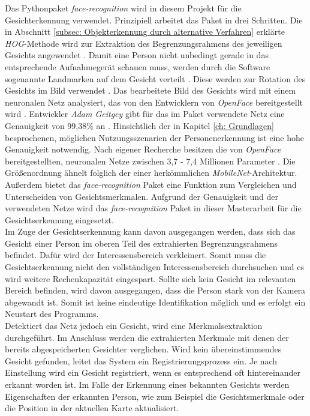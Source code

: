 	Das Pythonpaket \textit{face-recognition} wird in diesem Projekt für die Gesichterkennung verwendet. Prinzipiell arbeitet das Paket in drei Schritten. Die in Abschnitt \ref{subsec: Objekterkennung durch alternative Verfahren} erklärte \textit{HOG}-Methode wird zur Extraktion des Begrenzungsrahmens des jeweiligen Gesichts angewendet \cite{facerecarticle}. Damit eine Person nicht unbedingt gerade in das entsprechende Aufnahmegerät schauen muss, werden durch die Software sogenannte Landmarken auf dem Gesicht verteilt \cite{facerecarticle}. Diese werden zur Rotation des Gesichts im Bild verwendet \cite{facerecarticle}. Das bearbeitete Bild des Gesichts wird mit einem neuronalen Netz analysiert, das von den Entwicklern von \textit{OpenFace} bereitgestellt wird \cite{facerecarticle}. Entwickler \textit{Adam Geitgey} gibt für das im Paket verwendete Netz eine Genauigkeit von 99,38$\percent$ an \cite{facerecognition}. Hinsichtlich der in Kapitel \ref{ch: Grundlagen} besprochenen, möglichen Nutzungsszenarien der Personenerkennung ist eine hohe Genauigkeit notwendig. Nach eigener Recherche besitzen die von \textit{OpenFace} bereitgestellten, neuronalen Netze zwischen 3,7 - 7,4 Millionen Parameter \cite{openface}. Die Größenordnung ähnelt folglich der einer herkömmlichen \textit{MobileNet}-Architektur. Außerdem bietet das \textit{face-recognition} Paket eine Funktion zum Vergleichen und Unterscheiden von Gesichtsmerkmalen. Aufgrund der Genauigkeit und der verwendeten Netze wird das \textit{face-recognition} Paket in dieser Masterarbeit für die Gesichtserkennung eingesetzt.\\
	
	Im Zuge der Gesichtserkennung kann davon ausgegangen werden, dass sich das Gesicht einer Person im oberen Teil des extrahierten Begrenzungsrahmens befindet. Dafür wird der Interessensbereich verkleinert. Somit muss die Gesichtserkennung nicht den vollständigen Interessensbereich durchsuchen und es wird weitere Rechenkapazität eingespart. Sollte sich kein Gesicht im relevanten Bereich befinden, wird davon ausgegangen, dass die Person stark von der Kamera abgewandt ist. Somit ist keine eindeutige Identifikation möglich und es erfolgt ein Neustart des Programms.\\
	
	Detektiert das Netz jedoch ein Gesicht, wird eine Merkmalsextraktion durchgeführt. Im Anschluss werden die extrahierten Merkmale mit denen der bereits abgespeicherten Gesichter verglichen. Wird kein übereinstimmendes Gesicht gefunden, leitet das System ein Registrierungsprozess ein. Je nach Einstellung wird ein Gesicht registriert, wenn es entsprechend oft hintereinander erkannt worden ist. Im Falle der Erkennung eines bekannten Gesichts werden Eigenschaften der erkannten Person, wie zum Beispiel die Gesichtsmerkmale oder die Position in der aktuellen Karte aktualisiert. \\ 
	
	  

	

		
	
		
		
				   		


